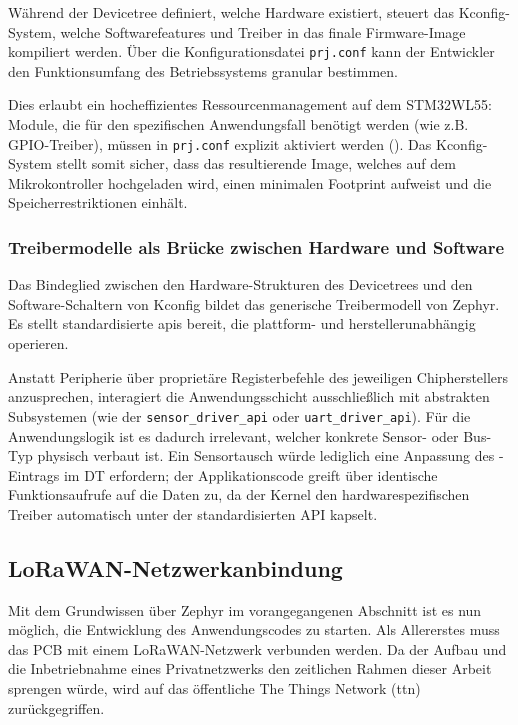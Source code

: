 Während der Devicetree definiert, welche Hardware existiert, steuert das Kconfig-System, welche Softwarefeatures und Treiber 
in das finale Firmware-Image kompiliert werden. Über die Konfigurationsdatei \verb|prj.conf| kann der Entwickler den Funktionsumfang 
des Betriebssystems granular bestimmen.

Dies erlaubt ein hocheffizientes Ressourcenmanagement auf dem STM32WL55: Module, die für den spezifischen Anwendungsfall benötigt 
werden (wie z.B. GPIO-Treiber), müssen in \verb|prj.conf| explizit aktiviert werden ().  
Das Kconfig-System stellt somit sicher, dass das resultierende Image, welches auf dem Mikrokontroller
hochgeladen wird, einen minimalen Footprint aufweist und die Speicherrestriktionen einhält.

\subsubsection{Treibermodelle als Brücke zwischen Hardware und Software}

Das Bindeglied zwischen den Hardware-Strukturen des Devicetrees und den Software-Schaltern von Kconfig bildet das 
generische Treibermodell von Zephyr. Es stellt standardisierte \acrshort{api}s bereit, die plattform- und herstellerunabhängig operieren.

Anstatt Peripherie über proprietäre Registerbefehle des jeweiligen Chipherstellers anzusprechen, interagiert die Anwendungsschicht 
ausschließlich mit abstrakten Subsystemen (wie der \verb|sensor_driver_api| oder \verb|uart_driver_api|). 
Für die Anwendungslogik ist es dadurch irrelevant, welcher konkrete Sensor- oder Bus-Typ physisch verbaut ist. Ein Sensortausch würde 
lediglich eine Anpassung des -Eintrags im DT erfordern; der Applikationscode 
greift über identische Funktionsaufrufe auf die Daten zu, da der Kernel den hardwarespezifischen Treiber automatisch 
unter der standardisierten API kapselt. 

\subsection{LoRaWAN-Netzwerkanbindung}

Mit dem Grundwissen über Zephyr im vorangegangenen Abschnitt ist es nun möglich, die Entwicklung des Anwendungscodes
zu starten. Als Allererstes muss das PCB mit einem LoRaWAN-Netzwerk verbunden werden. Da der Aufbau und die Inbetriebnahme eines 
Privatnetzwerks den zeitlichen Rahmen dieser Arbeit sprengen würde, wird auf das öffentliche The Things Network (\acrshort{ttn}) 
zurückgegriffen. 

